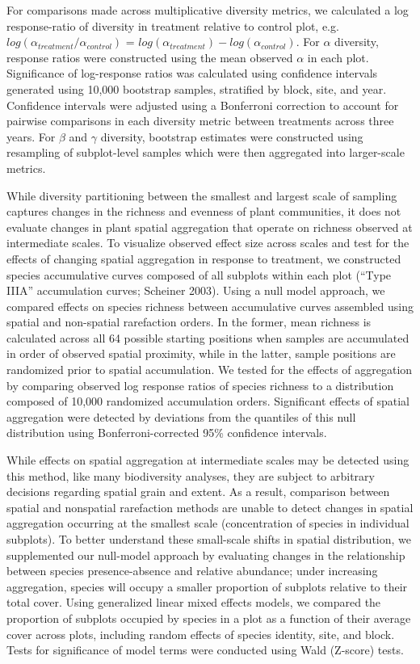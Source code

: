 \documentclass[twoside,12pt,final]{ucthesis-CA2012}
\begin{document}
\begin{ucmainmatter}
For comparisons made across multiplicative diversity metrics, we calculated a log response-ratio of diversity in treatment relative to control plot, e.g.~\(log(\alpha_{treatment} / \alpha_{control})\) = \(log(\alpha_{treatment}) - log(\alpha_{control})\). For \(\alpha\) diversity, response ratios were constructed using the mean observed \(\alpha\) in each plot. Significance of log-response ratios was calculated using confidence intervals generated using 10,000 bootstrap samples, stratified by block, site, and year. Confidence intervals were adjusted using a Bonferroni correction to account for pairwise comparisons in each diversity metric between treatments across three years. For \(\beta\) and \(\gamma\) diversity, bootstrap estimates were constructed using resampling of subplot-level samples which were then aggregated into larger-scale metrics.

While diversity partitioning between the smallest and largest scale of sampling captures changes in the richness and evenness of plant communities, it does not evaluate changes in plant spatial aggregation that operate on richness observed at intermediate scales. To visualize observed effect size across scales and test for the effects of changing spatial aggregation in response to treatment, we constructed species accumulative curves composed of all subplots within each plot (``Type IIIA'' accumulation curves; Scheiner 2003). Using a null model approach, we compared effects on species richness between accumulative curves assembled using spatial and non-spatial rarefaction orders. In the former, mean richness is calculated across all 64 possible starting positions when samples are accumulated in order of observed spatial proximity, while in the latter, sample positions are randomized prior to spatial accumulation. We tested for the effects of aggregation by comparing observed log response ratios of species richness to a distribution composed of 10,000 randomized accumulation orders. Significant effects of spatial aggregation were detected by deviations from the quantiles of this null distribution using Bonferroni-corrected 95\% confidence intervals.

While effects on spatial aggregation at intermediate scales may be detected using this method, like many biodiversity analyses, they are subject to arbitrary decisions regarding spatial grain and extent. As a result, comparison between spatial and nonspatial rarefaction methods are unable to detect changes in spatial aggregation occurring at the smallest scale (concentration of species in individual subplots). To better understand these small-scale shifts in spatial distribution, we supplemented our null-model approach by evaluating changes in the relationship between species presence-absence and relative abundance; under increasing aggregation, species will occupy a smaller proportion of subplots relative to their total cover. Using generalized linear mixed effects models, we compared the proportion of subplots occupied by species in a plot as a function of their average cover across plots, including random effects of species identity, site, and block. Tests for significance of model terms were conducted using Wald (Z-score) tests.


\end{ucmainmatter}
\end{document}
